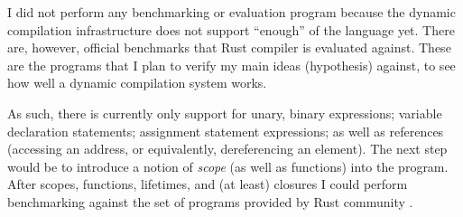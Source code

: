 I did not perform any benchmarking or evaluation
program because the dynamic compilation infrastructure
does not support ``enough'' of the language yet.
There are, however, official benchmarks that Rust
compiler is evaluated against. These are the
programs that I plan to verify my main ideas (hypothesis)
against, to see how well a dynamic compilation system works.

As such, there is currently only support for
unary, binary expressions; variable declaration
statements; assignment statement expressions;
as well as references (accessing an address,
or equivalently, dereferencing an element).
The next step would be to introduce a notion of \textit{scope}
(as well as functions) into the program.
After scopes, functions, lifetimes, and (at least) closures
I could perform benchmarking against the set of programs
provided by Rust community \cite{rustbenchmark}.
